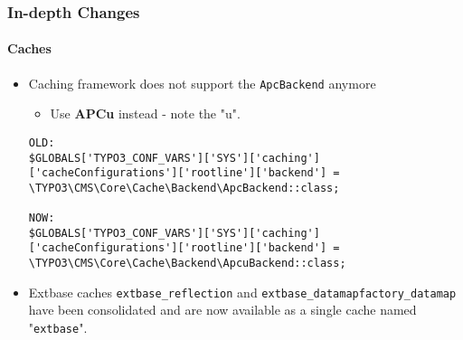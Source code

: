 \begin{frame}[fragile]
	\frametitle{In-depth Changes}
	\framesubtitle{Caches}

	\lstset{basicstyle=\tiny\ttfamily}

	\begin{itemize}
		\item Caching framework does not support the \texttt{ApcBackend} anymore

			\begin{itemize}\smaller
				\item[\ding{228}] Use \textbf{APCu} instead - note the "u".
			\end{itemize}
\begin{lstlisting}
OLD:
$GLOBALS['TYPO3_CONF_VARS']['SYS']['caching']['cacheConfigurations']['rootline']['backend'] =
\TYPO3\CMS\Core\Cache\Backend\ApcBackend::class;

NOW:
$GLOBALS['TYPO3_CONF_VARS']['SYS']['caching']['cacheConfigurations']['rootline']['backend'] =
\TYPO3\CMS\Core\Cache\Backend\ApcuBackend::class;
\end{lstlisting}

		\item Extbase caches \texttt{extbase\_reflection} and \texttt{extbase\_datamapfactory\_datamap}
			have been consolidated and are now available as a single cache named "\texttt{extbase}".

	\end{itemize}

\end{frame}


